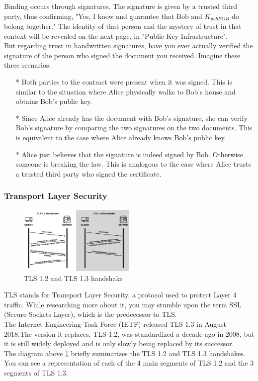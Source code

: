 Binding occurs through signatures. The signature is given by a trusted third party, 
thus confirming, "Yes, I know and guarantee that Bob and $K_{pubBOB}$ do belong together." 
The identity of that person and the mystery of trust in that context will be revealed 
on the next page, in "Public Key Infrastructure".
\\
But regarding trust in handwritten signatures, have you ever actually verified the 
signature of the person who signed the document you received. Imagine these three scenarios:
\begin{itemize}
    \item[*] Both parties to the contract were present when it was signed. This is similar to the situation where Alice physically walks to Bob's house and obtains Bob's public key.
    \item[*] Since Alice already has the document with Bob's signature, she can verify Bob's signature by comparing the two signatures on the two documents. This is equivalent to the case where Alice already knows Bob's public key.
    \item[*] Alice just believes that the signature is indeed signed by Bob. Otherwise someone is breaking the law. This is analogous to the case where Alice trusts a trusted third party who signed the certificate.
\end{itemize}

\subsubsection{Transport Layer Security}\cite{b38}

\begin{figure}[H] %
    \centering %
    \includegraphics[width=0.5\textwidth]{figures/TLS.png} %
    \caption{TLS 1.2 and TLS 1.3 handshake} %
    \label{Fig.2: TLS 1.2 and TLS 1.3 handshake} %
\end{figure}

TLS stands for Transport Layer Security, a protocol used to protect Layer 4 traffic. 
While researching more about it, you may stumble upon the term SSL (Secure Sockets Layer), 
which is the predecessor to TLS.
\\
The Internet Engineering Task Force (IETF) released TLS 1.3 in August 2018.The version it 
replaces, TLS 1.2, was standardized a decade ago in 2008, but it is still widely deployed 
and is only slowly being replaced by its successor.
\\
The diagram above \ref{Fig.2: TLS 1.2 and TLS 1.3 handshake} briefly summarizes the 
TLS 1.2 and TLS 1.3 handshakes. You can see a 
representation of each of the 4 main segments of TLS 1.2 and the 3 segments of TLS 1.3.

